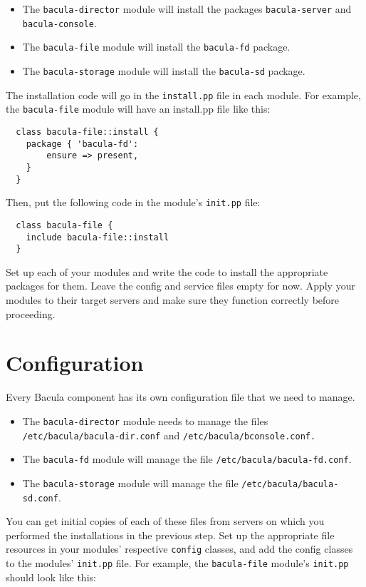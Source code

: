\documentclass{article}   	%
\begin{document}
\begin{itemize}
	\item The \texttt{bacula-director} module will install the packages \texttt{bacula-server} and \texttt{bacula-console}.
	\item The \texttt{bacula-file} module will install the \texttt{bacula-fd} package.
	\item The \texttt{bacula-storage} module will install the \texttt{bacula-sd} package.
\end{itemize}

The installation code will go in the \texttt{install.pp} file in each module.  For example, the \texttt{bacula-file} module will have an install.pp file like this:

\begin{verbatim}
  class bacula-file::install {
    package { 'bacula-fd': 
        ensure => present,
    }
  }
\end{verbatim}

Then, put the following code in the module's \texttt{init.pp} file:

\begin{verbatim}
  class bacula-file {
    include bacula-file::install
  }
\end{verbatim}

Set up each of your modules and write the code to install the appropriate packages for them.  Leave the config and service files empty for now.  Apply your modules to their target servers and make sure they function correctly before proceeding.

\section{Configuration}
Every Bacula component has its own configuration file that we need to manage.  

\begin{itemize}
	\item The \texttt{bacula-director} module needs to manage the files \texttt{/etc/bacula/bacula-dir.conf} and \texttt{/etc/bacula/bconsole.conf.}
	\item The \texttt{bacula-fd} module will manage the file \texttt{/etc/bacula/bacula-fd.conf}.
	\item The \texttt{bacula-storage} module will manage the file \texttt{/etc/bacula/bacula-sd.conf}.
\end{itemize}

You can get initial copies of each of these files from servers on which you performed the installations in the previous step. Set up the appropriate file resources in your modules' respective \texttt{config} classes, and add the config classes to the modules' \texttt{init.pp} file.  For example, the \texttt{bacula-file} module's \texttt{init.pp} should look like this:
\end{document}
